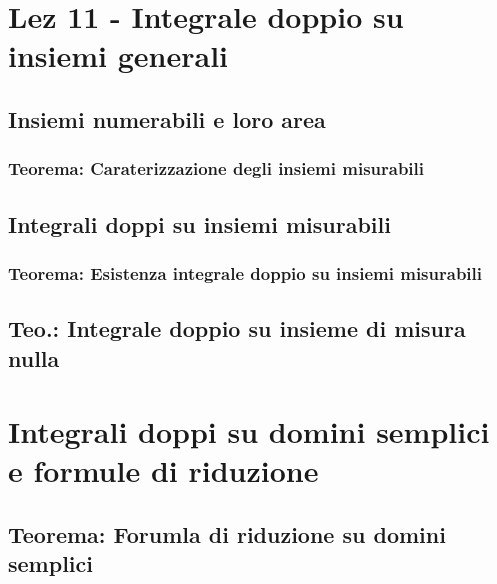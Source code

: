 \section{Lez 11 - Integrale doppio su insiemi generali}
\subsection{Insiemi numerabili e loro area}
\subsubsection{Teorema: Caraterizzazione degli insiemi misurabili}
\subsection{Integrali doppi su insiemi misurabili}
\subsubsection{Teorema: Esistenza integrale doppio su insiemi misurabili}
\subsection{Teo.: Integrale doppio su insieme di misura nulla}
\section{Integrali doppi su domini semplici e formule di riduzione}
\subsection{Teorema: Forumla di riduzione su domini semplici}